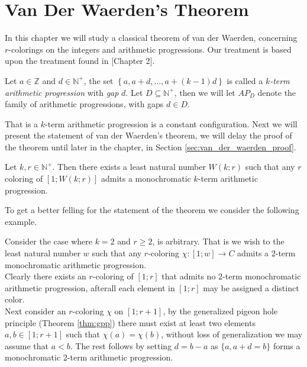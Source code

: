 \section{Van Der Waerden's Theorem}
In this chapter we will study a classical theorem of van der Waerden, concerning $r$-colorings on the integers and arithmetic progressions. Our treatment is based upon the treatment found in \cite{rtoi}[Chapter 2].

\begin{definition}
	Let $a \in \mathbb{Z}$ and $d \in \mathbb{N}^{+}$, the set $\left\{a, a + d, \ldots, a + (k - 1)d\right\}$ is called a \textit{$k$-term arithmetic progression} with \textit{gap} $d$. Let $D \subseteq \mathbb{N}^{+}$, then we will let $AP_D$ denote the family of arithmetic progressions, with gaps $d \in D$.
\end{definition}
That is a $k$-term arithmetic progression is a constant configuration. Next we will present the statement of van der Waerden's theorem, we will delay the proof of the theorem until later in the chapter, in Section \ref{sec:van_der_waerden_proof}.

\begin{theorem}\label{thm:van_der_waerden}
	Let $k, r \in \mathbb{N}^{+}$. Then there exists a least natural number $W(k;r)$ such that any $r$ coloring of $[1; W(k;r)]$ admits a monochromatic $k$-term arithmetic progression.
\end{theorem}
To get a better felling for the statement of the theorem we consider the following example.
\begin{example}\label{exmp:Van_Der_Waerden_2_2}
	Consider the case where $k = 2$ and $r \geq 2$, is arbitrary.
	That is we wish to the least natural number $w$ such that any $r$-coloring $\chi: [1; w] \to C$ admits a $2$-term monochromatic arithmetic progression.\\
	Clearly there exists an $r$-coloring of $[1; r]$ that admits no $2$-term monochromatic arithmetic progression, afterall each element in $[1; r]$ may be assigned a distinct color.\\
	Next consider an $r$-coloring $\chi$ on $[1; r + 1]$, by the generalized pigeon hole principle (Theorem \ref{thm:gpp}) there must exist at least two elements $a, b \in [1; r +  1]$ such that $\chi(a) = \chi(b)$, without loss of generalization we may assume that $a < b$.
	The rest follows by setting $d = b - a$ as $\{a, a + d = b\}$ forms a monochromatic $2$-term arithmetic progression.
\end{example}

